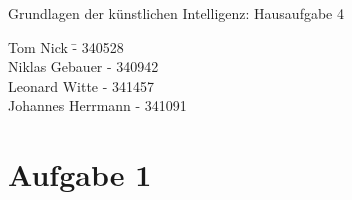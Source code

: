 \documentclass[a4paper,10pt]{article}
\begin{document}
\begin{center}
\Large{Grundlagen der künstlichen Intelligenz: Hausaufgabe 4} \\
\end{center}
\begin{tabbing}
Tom Nick \hspace{2cm}\= - 340528\\
Niklas Gebauer \> - 340942 \\
Leonard Witte \> - 341457 \\
Johannes Herrmann \> - 341091\\
\end{tabbing}

\section*{Aufgabe 1}
\end{document}
